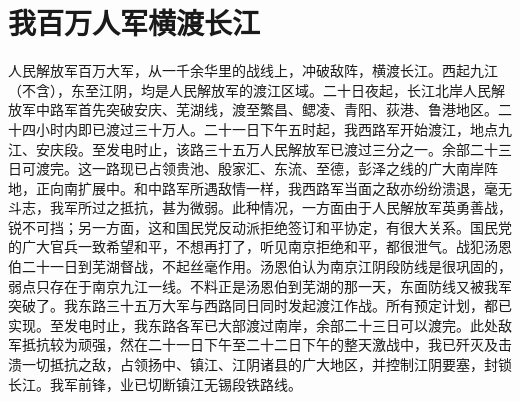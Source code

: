 \section[我百万人军横渡长江（一九四九年四月二十二日）]{我百万人军横渡长江}


人民解放军百万大军，从一千余华里的战线上，冲破敌阵，横渡长江。西起九江（不含），东至江阴，均是人民解放军的渡江区域。二十日夜起，长江北岸人民解放军中路军首先突破安庆、芜湖线，渡至繁昌、鳃凌、青阳、荻港、鲁港地区。二十四小时内即已渡过三十万人。二十一日下午五时起，我西路军开始渡江，地点九江、安庆段。至发电时止，该路三十五万人民解放军已渡过三分之一。余部二十三日可渡完。这一路现已占领贵池、殷家汇、东流、至德，彭泽之线的广大南岸阵地，正向南扩展中。和中路军所遇敌情一样，我西路军当面之敌亦纷纷溃退，毫无斗志，我军所过之抵抗，甚为微弱。此种情况，一方面由于人民解放军英勇善战，锐不可挡；另一方面，这和国民党反动派拒绝签订和平协定，有很大关系。国民党的广大官兵一致希望和平，不想再打了，听见南京拒绝和平，都很泄气。战犯汤恩伯二十一日到芜湖督战，不起丝毫作用。汤恩伯认为南京江阴段防线是很巩固的，弱点只存在于南京九江一线。不料正是汤恩伯到芜湖的那一天，东面防线又被我军突破了。我东路三十五万大军与西路同日同时发起渡江作战。所有预定计划，都已实现。至发电时止，我东路各军已大部渡过南岸，余部二十三日可以渡完。此处敌军抵抗较为顽强，然在二十一日下午至二十二日下午的整天激战中，我已歼灭及击溃一切抵抗之敌，占领扬中、镇江、江阴诸县的广大地区，并控制江阴要塞，封锁长江。我军前锋，业已切断镇江无锡段铁路线。


